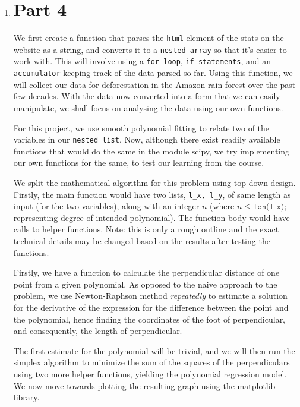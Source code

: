 \documentclass[12pt]{article}
\begin{document}
\begin{enumerate}
\item \section*{Part 4}

\begin{text}

We first create a function that parses the \texttt{html} element of the stats on the website as a string, and converts it to a \texttt{nested array} so that it’s easier to work with. This will involve using a \texttt{for loop}, \texttt{if statements}, and an \texttt{accumulator} keeping track of the data parsed so far. Using this function, we will collect our data for deforestation in the Amazon rain-forest over the past few decades. With the data now converted into a form that we can easily manipulate, we shall focus on analysing the data using our own functions.

For this project, we use smooth polynomial fitting to relate two of the variables in our \texttt{nested list}. Now, although there exist readily available functions that would do the same in the module scipy, we try implementing our own functions for the same, to test our learning from the course.

We split the mathematical algorithm for this problem using top-down design. Firstly, the main function would have two lists, \texttt{l\_x, l\_y}, of same length as input (for the two variables), along with an integer $n$ (where $n \leq \texttt{len(l\_x)}$; representing degree of intended polynomial). The function body would have calls to helper functions. Note: this is only a rough outline and the exact technical details may be changed based on the results after testing the functions.

Firstly, we have a function to calculate the perpendicular distance of one point from a given polynomial. As opposed to the naive approach to the problem, we use Newton-Raphson method \textit{repeatedly} to estimate a solution for the derivative of the expression for the difference between the point and the polynomial, hence finding the coordinates of the foot of perpendicular, and consequently, the length of perpendicular.

The first estimate for the polynomial will be trivial, and we will then run the simplex algorithm to minimize the sum of the squares of the perpendiculars using two more helper functions, yielding the polynomial regression model. We now move towards plotting the resulting graph using the matplotlib library.


\end{text}
\end{enumerate}
\end{document}

